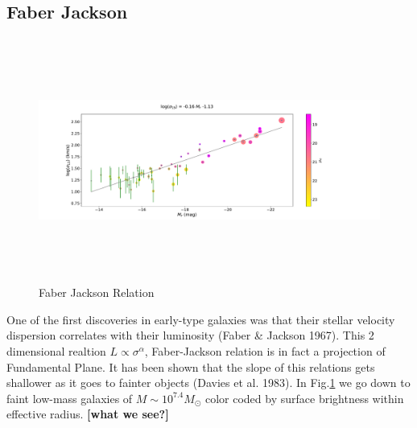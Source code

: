 \documentclass{aa}
\begin{document}
\subsection{Faber Jackson}
\begin{figure}[!htb]
   \centering
   \includegraphics[width=37cm,height=8cm,keepaspectratio]{../2_pipeline/2_FJ/Faber_Jackson_x-axis=M_r.pdf}
         \caption{Faber Jackson Relation}
         \label{fig:FJ}
\end{figure}
One of the first discoveries in early-type galaxies was that their stellar velocity dispersion correlates with their luminosity (Faber \& Jackson 1967). This 2 dimensional realtion $L\propto\sigma^\alpha$, Faber-Jackson relation is in fact a projection
 of Fundamental Plane. It has been shown that the slope of this relations gets shallower as it goes to fainter objects (Davies et al. 1983). In Fig.\ref{fig:FJ} we go down to faint low-mass galaxies of $M\sim 10^{7.4}M_\odot$ color coded by surface brightness within effective radius. \textbf{[what we see?]}\\

\end{document}
